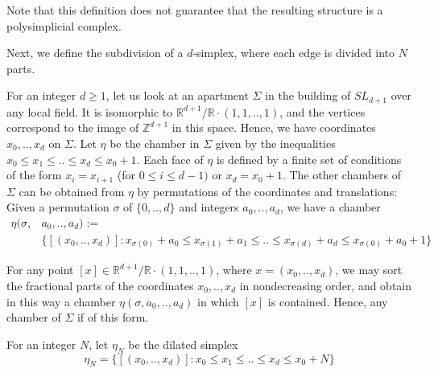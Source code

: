 \documentclass{amsart}
\theoremstyle{theorem}
\theoremstyle{lemma}
\theoremstyle{prop}
\theoremstyle{definition}
\theoremstyle{corollary}
\theoremstyle{remark}
\newcommand{\Z}{\mathbb{Z}}
\newcommand{\R}{\mathbb{R}}
\begin{document}
Note that this definition does not guarantee that the resulting structure is a polysimplicial complex. 

Next, we define the subdivision of a $d$-simplex, where each edge is divided into $N$ parts.

For an integer $d\geq 1$, let us look at an apartment $\Sigma$ in the building of $SL_{d+1}$ over any local field. It is isomorphic to $\R^{d+1} / \R \cdot (1,1,..,1)$, and the vertices correspond to the image of $\Z^{d+1}$ in this space. Hence, we have coordinates $x_0,..,x_d$ on $\Sigma$. Let $\eta$ be the chamber in $\Sigma$ given by the inequalities $x_0 \leq x_1 \leq .. \leq x_d \leq x_0 + 1$. Each face of $\eta$ is defined by a finite set of conditions of the form $x_i=x_{i+1}$ (for $0\leq i \leq d-1)$ or $x_d=x_0+1$. The other chambers of $\Sigma$ can be obtained from $\eta$ by permutations of the coordinates and translations:
Given a permutation $\sigma$ of $\{0,..,d\}$ and integers $a_0,..,a_d$, we have a chamber
\begin{equation*}
\begin{split}
 \eta(\sigma,&a_0,..,a_d) := \\
 &\{ [(x_0,..,x_d)]: x_{\sigma(0)}+a_0 \leq x_{\sigma(1)}+a_1 \leq .. \leq x_{\sigma(d)}+a_d \leq x_{\sigma(0)}+a_0+1\}
\end{split}
\end{equation*}

For any point $[x] \in \R^{d+1} / \R \cdot (1,1,..,1)$, where $x=(x_0,..,x_d)$, we may sort the fractional parts of the coordinates $x_0,..,x_d$ in nondecreasing order, and obtain in this way a chamber $\eta(\sigma,a_0,..,a_d)$  in which $[x]$ is contained. Hence, any chamber of $\Sigma$ if of this form.

For an integer $N$, let $\eta_N$ be the dilated simplex
$$ \eta_N=  \{[(x_0,..,x_d)]: x_0 \leq x_1 \leq .. \leq x_d \leq x_0 + N\} $$
\end{document}
